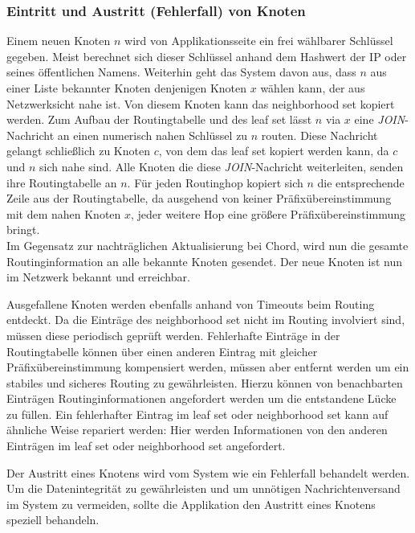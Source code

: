 \subsubsection*{Eintritt und Austritt (Fehlerfall) von Knoten}
Einem neuen Knoten $n$ wird von Applikationsseite ein frei wählbarer Schlüssel gegeben. Meist berechnet sich dieser Schlüssel anhand dem Hashwert der IP oder seines öffentlichen Namens. Weiterhin geht das System davon aus, dass $n$ aus einer Liste bekannter Knoten denjenigen Knoten $x$ wählen kann, der aus Netzwerksicht nahe ist. Von diesem Knoten kann das neighborhood set kopiert werden. Zum Aufbau der Routingtabelle und des leaf set lässt $n$ via $x$ eine \emph{JOIN}-Nachricht an einen numerisch nahen Schlüssel zu $n$ routen. Diese Nachricht gelangt schließlich zu Knoten $c$, von dem das leaf set kopiert werden kann, da $c$ und $n$ sich nahe sind. Alle Knoten die diese \emph{JOIN}-Nachricht weiterleiten, senden ihre Routingtabelle an $n$. Für jeden Routinghop kopiert sich $n$ die entsprechende Zeile aus der Routingtabelle, da ausgehend von keiner Präfixübereinstimmung mit dem nahen Knoten $x$, jeder weitere Hop eine größere Präfixübereinstimmung bringt.\\
Im Gegensatz zur nachträglichen Aktualisierung bei Chord, wird nun die gesamte Routinginformation an alle bekannte Knoten gesendet. Der neue Knoten ist nun im Netzwerk bekannt und erreichbar.

Ausgefallene Knoten werden ebenfalls anhand von Timeouts beim Routing entdeckt. Da die Einträge des neighborhood set nicht im Routing involviert sind, müssen diese periodisch geprüft werden. Fehlerhafte Einträge in der Routingtabelle können über einen anderen Eintrag mit gleicher Präfixübereinstimmung kompensiert werden, müssen aber entfernt werden um ein stabiles und sicheres Routing zu gewährleisten. Hierzu können von benachbarten Einträgen Routinginformationen angefordert werden um die entstandene Lücke zu füllen. Ein fehlerhafter Eintrag im leaf set oder neighborhood set kann auf ähnliche Weise repariert werden: Hier werden Informationen von den anderen Einträgen im leaf set oder neighborhood set angefordert.

Der Austritt eines Knotens wird vom System wie ein Fehlerfall behandelt werden. Um die Datenintegrität zu gewährleisten und um unnötigen Nachrichtenversand im System zu vermeiden, sollte die Applikation den Austritt eines Knotens speziell behandeln.

